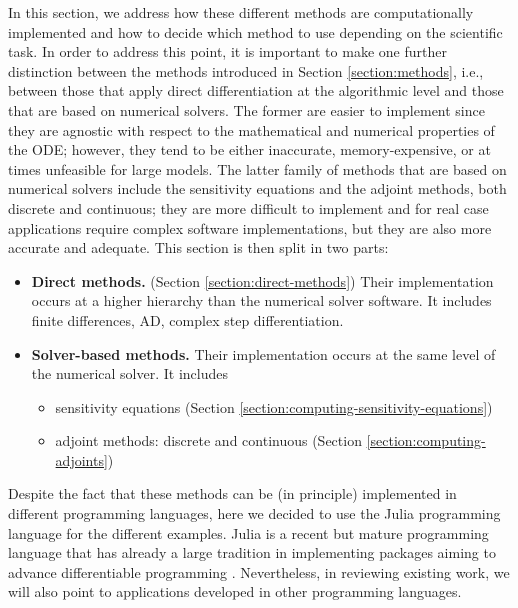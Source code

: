 
In this section, we address how these different methods are computationally implemented and how to decide which method to use depending on the scientific task.
In order to address this point, it is important to make one further distinction between the methods introduced in Section \ref{section:methods}, i.e., between those that apply direct differentiation at the algorithmic level and those that are based on numerical solvers.  
%
The former are easier to implement since they are agnostic with respect to the mathematical and numerical properties of the ODE; however, they tend to be either inaccurate, memory-expensive, or at times unfeasible for large models. 
The latter family of methods that are based on numerical solvers include the sensitivity equations and the adjoint methods, both discrete and continuous; they are more difficult to implement and for real case applications require complex software implementations, but they are also more accurate and adequate. 
This section is then split in two parts:
\begin{itemize}
    \item \textbf{Direct methods.} (Section \ref{section:direct-methods}) Their implementation occurs at a higher hierarchy than the numerical solver software. It includes finite differences, AD, complex step differentiation.
    \item \textbf{Solver-based methods.} Their implementation occurs at the same level of the numerical solver. It includes 
    \begin{itemize}
        \item sensitivity equations (Section \ref{section:computing-sensitivity-equations})
        \item adjoint methods: discrete and continuous (Section \ref{section:computing-adjoints})
    \end{itemize}
\end{itemize}
Despite the fact that these methods can be (in principle) implemented in different programming languages, here we decided to use the Julia programming language for the different examples. 
Julia is a recent but mature programming language that has already a large tradition in implementing packages aiming to advance differentiable programming \cite{Bezanson_Karpinski_Shah_Edelman_2012, Julialang_2017}.
Nevertheless, in reviewing existing work, we will also point to applications developed in other programming languages.